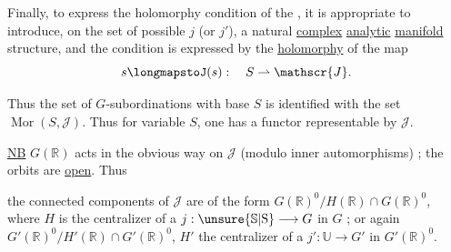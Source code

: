 Finally, to express the holomorphy condition of the , it is appropriate to introduce,  on the set  of possible $j$ (or $j'$), a natural \uline{complex} \uline{analytic} \uline{manifold} structure, and the condition is expressed by the \uline{holomorphy} of the map
\[
s\longmapstoJ(s):\quad S\rightharpoonup\mathscr{J}.
\]

 Thus the set of  $G$-subordinations with base $S$ is identified with the set $\operatorname{Mor}(S,\mathscr{J})$. Thus for variable $S$, one has a functor representable by $\mathscr{J}$.

\uline{NB} $G(\mathbb{R})$ acts in the obvious way on $\mathscr{J}$ (modulo inner automorphisms) ; the orbits are \uline{open}. Thus


the connected components of $\mathscr{J}$ are of the form $G(\mathbb{R})^{0}/H(\mathbb{R})\cap G(\mathbb{R})^{0}$, where $H$ is the centralizer of a $j:\unsure{\mathbb{S}|\mathrm{S}}\longrightarrow G$ in $G$ ; or again $G'(\mathbb{R})^{0}/H'(\mathbb{R})\cap G'(\mathbb{R})^{0}$, $H'$ the centralizer of a $j':\mathbb{U}\longrightarrow G'$ in $G'(\mathbb{R})^{0}$.
